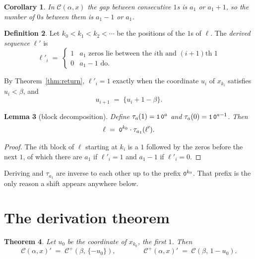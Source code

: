 \documentclass[11pt,a4paper]{article}
\newcommand{\seq}[1]{\texttt{\small #1}}
\newcommand{\C}{\mathcal{C}}
\newcommand{\Cp}{\mathcal{C}^{+}}
\theoremstyle{definition}
\newtheorem{definition}{Definition}
\theoremstyle{plain}
\newtheorem{theorem}[definition]{Theorem}
\newtheorem{lemma}[definition]{Lemma}
\newtheorem{corollary}[definition]{Corollary}
\begin{document}
\begin{corollary}\label{cor:gaps}
In $\C(\alpha,x)$ the gap between consecutive $1$s is $a_1$ or $a_1+1$, so the
number of $0$s between them is $a_1 - 1$ or $a_1$.
\end{corollary}

\begin{definition}
Let $k_0 < k_1 < k_2 < \cdots$ be the positions of the $1$s of $\ell$. The
\emph{derived sequence} $\ell'$ is
\[
  \ell'_i \;=\; \begin{cases}
    1 & \text{$a_1$ zeros lie between the $i$th and $(i{+}1)$th $1$} \\
    0 & \text{$a_1 - 1$ do.}
  \end{cases}
\]
\end{definition}

By Theorem~\ref{thm:return}, $\ell'_i = 1$ exactly when the coordinate $u_i$ of
$x_{k_i}$ satisfies $u_i < \beta$, and
\[
  u_{i+1} \;=\; \{u_i + 1 - \beta\} .
\]

\begin{lemma}[block decomposition]\label{lem:blocks}
Define $\tau_a(1) = \seq{1}\,\seq{0}^a$ and $\tau_a(0) = \seq{1}\,\seq{0}^{a-1}$.
Then
\[
  \ell \;=\; \seq{0}^{k_0} \cdot \tau_{a_1}(\ell') .
\]
\end{lemma}

\begin{proof}
The $i$th block of $\ell$ starting at $k_i$ is a $1$ followed by the zeros
before the next $1$, of which there are $a_1$ if $\ell'_i = 1$ and $a_1-1$ if
$\ell'_i = 0$.
\end{proof}

Deriving and $\tau_{a_1}$ are inverse to each other up to the prefix
$\seq{0}^{k_0}$. That prefix is the only reason a shift appears anywhere below.

\section{The derivation theorem}

\begin{theorem}\label{thm:derive}
Let $u_0$ be the coordinate of $x_{k_0}$, the first $1$. Then
\[
  \C(\alpha,x)' \;=\; \Cp(\beta,\, \{-u_0\}) ,
  \qquad\qquad
  \Cp(\alpha,x)' \;=\; \C(\beta,\, 1 - u_0) .
\]
\end{theorem}
\end{document}
